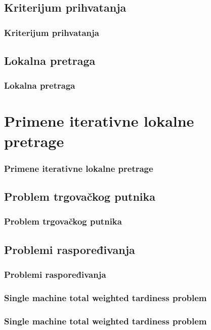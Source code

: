 \documentclass{beamer}
\begin{document}
\subsection{Kriterijum prihvatanja}
\begin{frame}[fragile]\frametitle{Kriterijum prihvatanja}
\end{frame}

\subsection{Lokalna pretraga}
\begin{frame}[fragile]\frametitle{Lokalna pretraga}

\end{frame}

\section{Primene iterativne lokalne pretrage}
\begin{frame}[fragile]\frametitle{Primene iterativne lokalne pretrage}

\end{frame}

\subsection{Problem trgovačkog putnika}
\begin{frame}[fragile]\frametitle{Problem trgovačkog putnika}

\end{frame}

\subsection{Problemi raspoređivanja}
\begin{frame}[fragile]\frametitle{Problemi raspoređivanja}

\end{frame}

\subsubsection{Single machine total weighted tardiness problem}
\begin{frame}[fragile]\frametitle{Single machine total weighted tardiness problem}

\end{frame}
\end{document}
